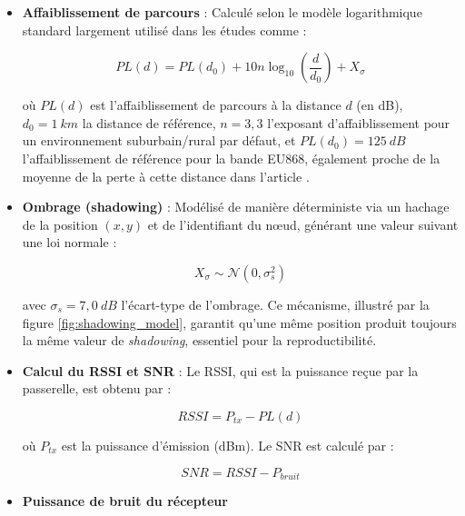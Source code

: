 \begin{itemize}
	\item \textbf{Affaiblissement de parcours} : Calculé selon le modèle logarithmique standard largement utilisé dans les études comme \cite{rappaport2002wireless,gonzalez2023lorawan} :
	
	\begin{equation}
		PL(d) = PL(d_0) + 10 n \log_{10}\left(\frac{d}{d_0}\right) + X_\sigma
		\label{eq:path_loss}
	\end{equation}
	
	où \(PL(d)\) est l'affaiblissement de parcours à la distance \(d\) (en dB), \(d_0 = 1\ km\) la distance de référence, \(n = 3,3\) l'exposant d'affaiblissement pour un environnement suburbain/rural par défaut, et \(PL(d_0) = 125\ dB\) l'affaiblissement de référence pour la bande EU868, également proche de la moyenne de la perte à cette distance dans l'article \cite{lrfhss_comparaison}.
	
	\item \textbf{Ombrage (shadowing)} : Modélisé de manière déterministe via un hachage de la position \((x, y)\) et de l'identifiant du nœud, générant une valeur suivant une loi normale :
	
	\begin{equation}
		X_{\sigma} \sim \mathcal{N}(0, \sigma_s^2)
		\label{eq:shadowing}
	\end{equation}
	
	avec \(\sigma_s = 7,0\ dB\) l'écart-type de l'ombrage. Ce mécanisme, illustré par la figure \ref{fig:shadowing_model}, garantit qu'une même position produit toujours la même valeur de \textit{shadowing}, essentiel pour la reproductibilité.
	
	\item \textbf{Calcul du RSSI et SNR} : Le RSSI, qui est la puissance reçue par la passerelle, est obtenu par :
	
	\begin{equation}
		RSSI = P_{tx} - PL(d)
		\label{eq:rssi}
	\end{equation}
	
	où \(P_{tx}\) est la puissance d'émission (dBm). Le SNR est calculé par :
	
	\begin{equation}
		SNR = RSSI - P_{bruit}
		\label{eq:snr}
	\end{equation}
	
	\item \textbf{Puissance de bruit du récepteur}
	

\end{itemize}
